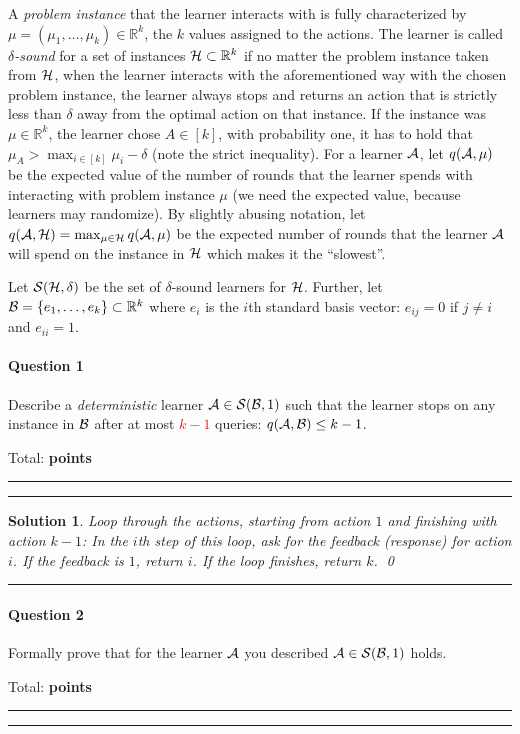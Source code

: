 \documentclass{article}
\newcommand{\R}{\mathbb{R}}
\DeclareMathOperator*{\1}{\mathbbm{1}}
\newcounter{DocPoints} %
\newcounter{QuestionPoints} %
\newcommand{\tpoints}[1]{        %
	\ifthenelse{\isempty{#1}}%
	{%
	}%
	{%
		\addtocounter{DocPoints}{#1}
		\addtocounter{QuestionPoints}{#1}
	}													 %
	\par\mbox{}\par\noindent\hfill {Total: \bf \arabic{QuestionPoints}\xspace points}\par\mbox{}\par\hrule\hrule
	\setcounter{QuestionPoints}{0}
}
\newtheorem*{solution*}{Solution}
\begin{document}
A \emph{problem instance} 
that the learner interacts with is fully characterized by $\mu = (\mu_1,\dots,\mu_k)\in \R^k$, the $k$ values assigned to the actions.
The learner is called \emph{$\delta$-sound} for a set of instances $\cH\subset \R^k$ if no matter the problem instance taken from $\mathcal{H}$, when the learner interacts with the aforementioned way with the chosen problem instance, the learner always stops and returns an action that is strictly less than $\delta$ away from the optimal action on that instance. If the instance was $\mu\in \R^k$, the learner chose $A\in [k]$, with probability one, it has to hold that $\mu_A> \max_{i\in [k]}\mu_i-\delta$ (note the strict inequality).
For a learner $\mathcal{A}$, let $q(\mathcal{A},\mu)$ be the expected value of the number of rounds that the learner spends with interacting with problem instance $\mu$ (we need the expected value, because learners may randomize).
By slightly abusing notation, let $q(\mathcal{A},\mathcal{H}) = \max_{\mu\in \mathcal{H}} q(\mathcal{A},\mu)$ be the expected number of rounds that the learner $\mathcal{A}$ will spend on the instance in $\mathcal{H}$ which makes it the ``slowest''.

Let $\mathcal{S}(\mathcal{H},\delta)$ be the set of $\delta$-sound learners for $\mathcal{H}$.
Further, let $\cB = \{e_1,\dots,e_k\}\subset \R^k$ 
where $e_i$ is the $i$th standard basis vector: $e_{ij}=0$ if $j\ne i$ and $e_{ii}=1$.


\paragraph{Question 1} 
Describe a \emph{deterministic} learner $\mathcal{A}\in \mathcal{S}(\mathcal{B},1)$ such that the learner stops on any instance in $\mathcal{B}$ after at most \textcolor{red}{$k-1$} queries: $q(\mathcal{A},\mathcal{B})\le k-1$. 
\tpoints{5}

\begin{solution*}
Loop through the actions, starting from action $1$ and finishing with action $k-1$:
In the $i$th step of this loop, ask for the feedback (response) for action $i$.
If the feedback is $1$, return $i$. If the loop finishes, return $k$.
\qed\par\bigskip\par\hrule
\end{solution*}

\paragraph{Question 2} 
Formally prove that for the learner $\mathcal{A}$ you described $\mathcal{A}\in \mathcal{S}(\mathcal{B},1)$ holds.
\tpoints{5}
\end{document}
